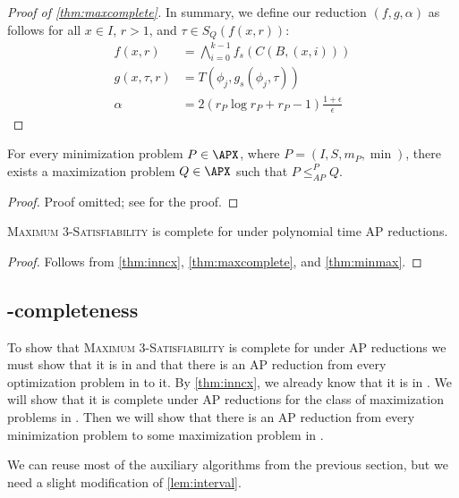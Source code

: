 \documentclass[]{article}
\newcommand{\APr}{\leq_{AP}^{P}}
\begin{document}
\begin{proof}[Proof of \autoref{thm:maxcomplete}]
  In summary, we define our reduction $(f, g, \alpha)$ as follows for all $x \in I$, $r > 1$, and $\tau \in S_Q(f(x, r))$:
  \begin{align*}
    f(x, r) & = \bigwedge_{i = 0}^{k - 1}{f_s(C(B, (x, i)))} \\
    g(x, \tau, r) & = T(\phi_j, g_s(\phi_j, \tau)) \\
    \alpha & = 2(r_P \log{r_P} + r_P - 1)\frac{1 + \epsilon}{\epsilon}
  \end{align*}
\end{proof}

\begin{theorem}\label{thm:minmax}
  For every minimization problem $P \in \APX$, where $P = (I, S, m_P, \min)$, there exists a maximization problem $Q \in \APX$ such that $P \APr Q$.
\end{theorem}
\begin{proof}
  Proof omitted; see \cite{book} for the proof.
\end{proof}

\begin{corollary}
  \textsc{Maximum 3-Satisfiability} is complete for \APX{} under polynomial time AP reductions.
\end{corollary}
\begin{proof}
  Follows from \autoref{thm:inncx}, \autoref{thm:maxcomplete}, and \autoref{thm:minmax}.
\end{proof}

\subsection{\texorpdfstring{\NCX}{NCX}-completeness}\label{ssc:ncxcomplete}

To show that \textsc{Maximum 3-Satisfiability} is complete for \NCX{} under \NC{} AP reductions we must show that it is in \NCX{} and that there is an \NC{} AP reduction from every optimization problem in \NCX{} to it.
By \autoref{thm:inncx}, we already know that it is in \NCX.
We will show that it is complete under \NC{} AP reductions for the class of maximization problems in \NCX.
Then we will show that there is an \NC{} AP reduction from every minimization problem to some maximization problem in \NCX.

We can reuse most of the auxiliary algorithms from the previous section, but we need a slight modification of \autoref{lem:interval}.
\end{document}
